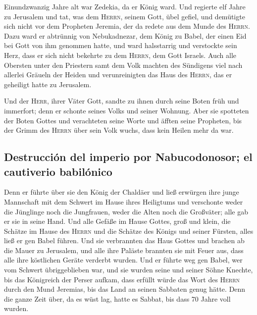  Einundzwanzig Jahre alt war Zedekia, da er König ward.
Und regierte elf Jahre zu Jerusalem  und tat, was dem
\textsc{Herrn}, seinem Gott, übel gefiel, und demütigte sich nicht vor
dem Propheten Jeremia, der da redete aus dem Munde des \textsc{Herrn}.
 Dazu ward er abtrünnig von Nebukadnezar, dem König zu
Babel, der einen Eid bei Gott von ihm genommen hatte, und ward
halsstarrig und verstockte sein Herz, dass er sich nicht bekehrte zu dem
\textsc{Herrn}, dem Gott Israels.  Auch alle Obersten
unter den Priestern samt dem Volk machten des Sündigens viel nach
allerlei Gräueln der Heiden und verunreinigten das Haus des
\textsc{Herrn}, das er geheiligt hatte zu Jerusalem.

 Und der \textsc{Herr}, ihrer Väter Gott, sandte zu ihnen
durch seine Boten früh und immerfort; denn er schonte seines Volks und
seiner Wohnung.  Aber sie spotteten der Boten Gottes und
verachteten seine Worte und äfften seine Propheten, bis der Grimm des
\textsc{Herrn} über sein Volk wuchs, dass kein Heilen mehr da war.

\hypertarget{destrucciuxf3n-del-imperio-por-nabucodonosor-el-cautiverio-babiluxf3nico}{%
\subsection{Destrucción del imperio por Nabucodonosor; el cautiverio
babilónico}\label{destrucciuxf3n-del-imperio-por-nabucodonosor-el-cautiverio-babiluxf3nico}}

 Denn er führte über sie den König der Chaldäer und ließ
erwürgen ihre junge Mannschaft mit dem Schwert im Hause ihres Heiligtums
und verschonte weder die Jünglinge noch die Jungfrauen, weder die Alten
noch die Großväter; alle gab er sie in seine Hand.  Und
alle Gefäße im Hause Gottes, groß und klein, die Schätze im Hause des
\textsc{Herrn} und die Schätze des Königs und seiner Fürsten, alles ließ
er gen Babel führen.  Und sie verbrannten das Haus Gottes
und brachen ab die Mauer zu Jerusalem, und alle ihre Paläste brannten
sie mit Feuer aus, dass alle ihre köstlichen Geräte verderbt wurden.
 Und er führte weg gen Babel, wer vom Schwert
übriggeblieben war, und sie wurden seine und seiner Söhne Knechte, bis
das Königreich der Perser aufkam,  dass erfüllt würde das
Wort des \textsc{Herrn} durch den Mund Jeremias, bis das Land an seinen
Sabbaten genug hätte. Denn die ganze Zeit über, da es wüst lag, hatte es
Sabbat, bis dass 70 Jahre voll wurden.

